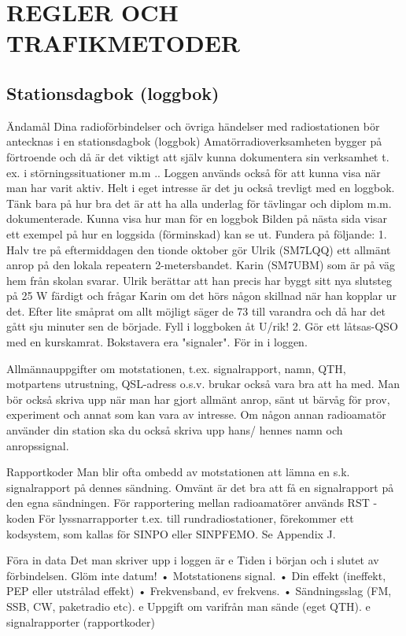 \chapter{REGLER OCH TRAFIKMETODER}

\section{Stationsdagbok (loggbok)}
Ändamål
Dina radioförbindelser och övriga händelser
med radiostationen bör antecknas i en
stationsdagbok (loggbok)
Amatörradioverksamheten bygger på förtroende och då är det viktigt att själv kunna
dokumentera sin verksamhet t. ex. i störningssituationer m.m .. Loggen används också för
att kunna visa när man har varit aktiv.
Helt i eget intresse är det ju också trevligt
med en loggbok. Tänk bara på hur bra det är
att ha alla underlag för tävlingar och diplom
m.m. dokumenterade.
Kunna visa hur man för en loggbok
Bilden på nästa sida visar ett exempel på
hur en loggsida (förminskad) kan se ut.
Fundera på följande:
1. Halv tre på eftermiddagen den tionde
oktober gör Ulrik (SM7LQQ) ett allmänt anrop på den lokala repeatern 2-metersbandet.
Karin (SM7UBM) som är på väg hem från
skolan svarar. Ulrik berättar att han precis
har byggt sitt nya slutsteg på 25 W färdigt
och frågar Karin om det hörs någon skillnad
när han kopplar ur det. Efter lite småprat om
allt möjligt säger de 73 till varandra och då
har det gått sju minuter sen de började.
Fyll i loggboken åt U/rik!
2. Gör ett låtsas-QSO med en kurskamrat. Bokstavera era "signaler". För in i loggen.

Allmännauppgifter om motstationen, t.ex.
signalrapport, namn, QTH, motpartens utrustning, QSL-adress o.s.v. brukar också
vara bra att ha med.
Man bör också skriva upp när man har
gjort allmänt anrop, sänt ut bärvåg för prov,
experiment och annat som kan vara av intresse.
Om någon annan radioamatör använder
din station ska du också skriva upp hans/
hennes namn och anropssignal.

Rapportkoder
Man blir ofta ombedd av motstationen att
lämna en s.k. signalrapport på dennes sändning. Omvänt är det bra att få en signalrapport på den egna sändningen.
För rapportering mellan radioamatörer
används RST -koden
För lyssnarrapporter t.ex. till rundradiostationer, förekommer ett kodsystem, som
kallas för SINPO eller SINPFEMO.
Se Appendix J.

Föra in data
Det man skriver upp i loggen är
e
Tiden i början och i slutet av förbindelsen.
Glöm inte datum!
• Motstationens signal.
• Din effekt (ineffekt, PEP eller utstrålad
effekt)
• Frekvensband, ev frekvens.
• Sändningsslag (FM, SSB, CW, paketradio etc).
e
Uppgift om varifrån man sände (eget
QTH).
e
signalrapporter (rapportkoder)
